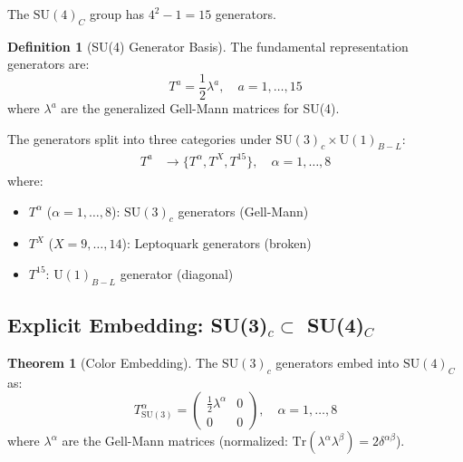 \documentclass[11pt,a4paper]{article}
\theoremstyle{definition}
\newtheorem{definition}{Definition}[section]
\newtheorem{theorem}{Theorem}[section]
\begin{document}
The $\text{SU}(4)_C$ group has $4^2 - 1 = 15$ generators.

\begin{definition}[SU(4) Generator Basis]
\label{def:su4-generators}
The fundamental representation generators are:
\begin{equation}
  \label{eq:su4-gen-explicit}
  T^a = \frac{1}{2} \lambda^a, \quad a = 1, \ldots, 15
\end{equation}
where $\lambda^a$ are the generalized Gell-Mann matrices for SU(4).
\end{definition}

The generators split into three categories under $\text{SU}(3)_c \times \text{U}(1)_{B-L}$:
\begin{align}
  \label{eq:su4-split}
  T^a &\to \{T^{\alpha}, T^X, T^{15}\}, \quad \alpha = 1, \ldots, 8
\end{align}
where:
\begin{itemize}
  \item $T^{\alpha}$ ($\alpha = 1, \ldots, 8$): $\text{SU}(3)_c$ generators (Gell-Mann)
  \item $T^X$ ($X = 9, \ldots, 14$): Leptoquark generators (broken)
  \item $T^{15}$: $\text{U}(1)_{B-L}$ generator (diagonal)
\end{itemize}

\subsection{Explicit Embedding: SU(3)$_c \subset$ SU(4)$_C$}
\label{subsec:su3-embedding}

\begin{theorem}[Color Embedding]
\label{thm:color-embedding}
The $\text{SU}(3)_c$ generators embed into $\text{SU}(4)_C$ as:
\begin{equation}
  \label{eq:color-embedding}
  T^{\alpha}_{\text{SU}(3)} = \begin{pmatrix}
    \frac{1}{2}\lambda^{\alpha} & 0 \\
    0 & 0
  \end{pmatrix}, \quad \alpha = 1, \ldots, 8
\end{equation}
where $\lambda^{\alpha}$ are the Gell-Mann matrices (normalized: $\text{Tr}(\lambda^{\alpha}\lambda^{\beta}) = 2\delta^{\alpha\beta}$).
\end{theorem}
\end{document}
